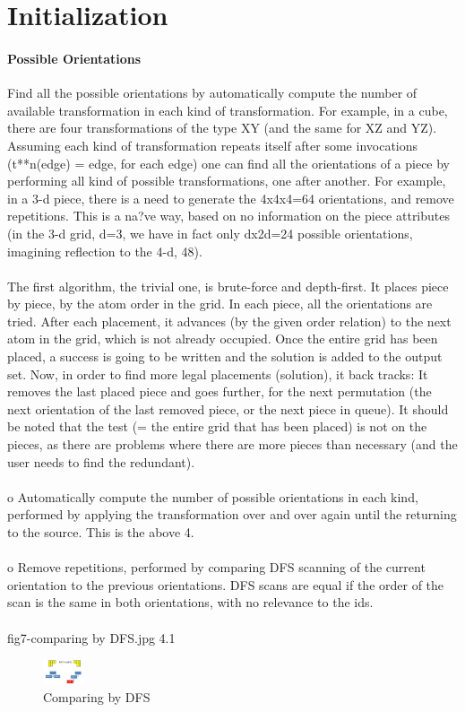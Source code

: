 \documentclass[a4paper,twoside,10pt]{report}
\begin{document}
\chapter{Initialization}\label{Initialization}

\subsubsection{Possible Orientations}

Find all the possible orientations by automatically compute the number of available transformation in each kind of transformation. For example, in a cube, there are four transformations of the type XY (and the same for XZ and YZ). Assuming each kind of transformation repeats itself after some invocations (t**n(edge) = edge, for each edge) one can find all the orientations of a piece by performing all kind of possible transformations, one after another. For example, in a 3-d piece, there is a need to generate the 4x4x4=64 orientations, and remove repetitions. This is a na?ve way, based on no information on the piece attributes (in the 3-d grid, d=3, we have in fact only dx2d=24 possible orientations, imagining reflection to the 4-d, 48).\\\\
The first algorithm, the trivial one, is brute-force and depth-first. It places piece by piece, by the atom order in the grid. In each piece, all the orientations are tried. After each placement, it advances (by the given order relation) to the next atom in the grid, which is not already occupied. Once the entire grid has been placed, a success is going to be written and the solution is added to the output set. Now, in order to find more legal placements (solution), it back tracks: It removes the last placed piece and goes further, for the next permutation (the next orientation of the last removed piece, or the next piece in queue). It should be noted that the test (= the entire grid that has been placed) is not on the pieces, as there are problems where there are more pieces than necessary (and the user needs to find the redundant).
\\
\\
o	Automatically compute the number of possible orientations in each kind, performed by applying the transformation over and over again until the returning to the source. This is the above 4.
\\
\\
o	Remove repetitions, performed by comparing DFS scanning of the current orientation to the previous orientations. DFS scans are equal if the order of the scan is the same in both orientations, with no relevance to the ids.
\\
\\
fig7-comparing by DFS.jpg 4.1
\\
\begin{figure}[p]
	\includegraphics[width=12mm]{fig7-comparing_by_DFS.jpg}
	\caption{Comparing by DFS}
	\label{fig:Comparing by DFS}
\end{figure}
\end{document}
